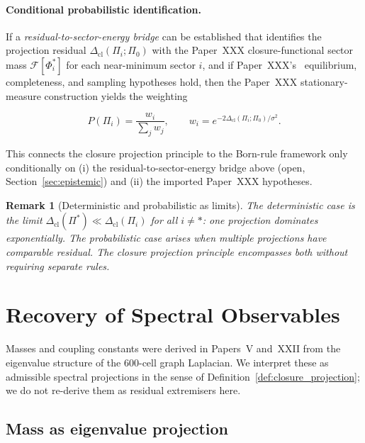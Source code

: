 \documentclass[12pt]{article}
\newtheorem{remark}[theorem]{Remark}
\newcommand{\Fcal}{\mathcal{F}}
\newcommand{\Dcl}{\Delta_{\mathrm{cl}}}
\begin{document}
\paragraph{Conditional probabilistic identification.} If a \emph{residual-to-sector-energy bridge} can be established that identifies the projection residual $\Dcl(\Pi_i;\Pi_0)$ with the Paper~XXX closure-functional sector mass $\Fcal[\Phi_i^*]$ for each near-minimum sector $i$, and if Paper~XXX's~\citep{SmartXXX} equilibrium, completeness, and sampling hypotheses hold, then the Paper~XXX stationary-measure construction yields the weighting

\begin{equation}\label{eq:born_weights}
    P(\Pi_i) = \frac{w_i}{\sum_j w_j}, \qquad w_i = e^{-2\Dcl(\Pi_i;\Pi_0)/\sigma^2}.
\end{equation}

This connects the closure projection principle to the Born-rule framework only conditionally on (i) the residual-to-sector-energy bridge above (open, Section~\ref{sec:epistemic}) and (ii) the imported Paper~XXX hypotheses.

\begin{remark}[Deterministic and probabilistic as limits]
The deterministic case is the limit $\Dcl(\Pi^*) \ll \Dcl(\Pi_i)$ for all $i \neq *$: one projection dominates exponentially. The probabilistic case arises when multiple projections have comparable residual. The closure projection principle encompasses both without requiring separate rules.
\end{remark}

\section{Recovery of Spectral Observables}\label{sec:spectral}

Masses and coupling constants were derived in Papers~V and~XXII from the eigenvalue structure of the 600-cell graph Laplacian. We interpret these as admissible spectral projections in the sense of Definition~\ref{def:closure_projection}; we do not re-derive them as residual extremisers here.

\subsection{Mass as eigenvalue projection}
\end{document}

